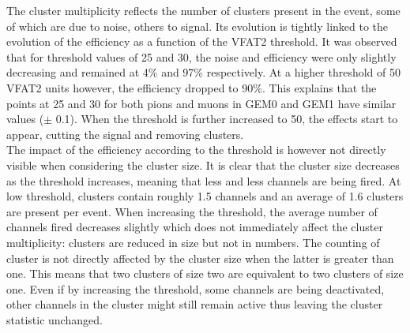       The cluster multiplicity reflects the number of clusters present in the event, some of which are due to noise, others to signal. Its evolution is tightly linked to the evolution of the efficiency as a function of the VFAT2 threshold. It was observed that for threshold values of 25 and 30, the noise and efficiency were only slightly decreasing and remained at 4\% and 97\% respectively. At a higher threshold of 50 VFAT2 units however, the efficiency dropped to 90\%. This explains that the points at 25 and 30 for both pions and muons in GEM0 and GEM1 have similar values ($\pm$ 0.1). When the threshold is further increased to 50, the effects start to appear, cutting the signal and removing clusters. \\

      The impact of the efficiency according to the threshold is however not directly visible when considering the cluster size. It is clear that the cluster size decreases as the threshold increases, meaning that less and less channels are being fired. At low threshold, clusters contain roughly 1.5 channels and an average of 1.6 clusters are present per event. When increasing the threshold, the average number of channels fired decreases slightly which does not immediately affect the cluster multiplicity: clusters are reduced in size but not in numbers. The counting of cluster is not directly affected by the cluster size when the latter is greater than one. This means that two clusters of size two are equivalent to two clusters of size one. Even if by increasing the threshold, some channels are being deactivated, other channels in the cluster might still remain active thus leaving the cluster statistic unchanged. \\


